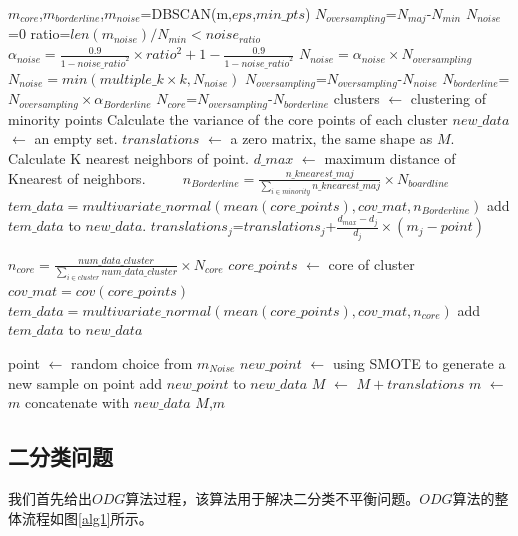 \documentclass{article}
\begin{document}
\begin{algorithm}[t]
  \begin{algorithmic}[1]
  \State $m_{core}$,$m_{borderline}$,$m_{noise}$=DBSCAN(m,$eps$,$min\_pts$) %
  \State $N_{oversampling}$=$N_{maj}$-$N_{min}$
      \State $N_{noise}$=0
  \Else
      \State ratio=$len(m_{noise})/N_{min}<noise_{ratio}$ 
      \State $\alpha_{noise}=\frac{0.9}{1-{noise\_{ratio}}^2}\times ratio^2+1-\frac{0.9}{1-{noise\_ratio}^2}$
      \State $N_{noise}=\alpha_{noise} \times N_{oversampling}$
      \State $N_{noise}=min(multiple\_k \times k, N_{noise})$
  \EndIf
  \State $N_{oversampling}$=$N_{oversampling}$-$N_{noise}$
  \State $N_{borderline}$=$N_{oversampling} \times \alpha_{Borderline}$
  \State $N_{core}$=$N_{oversampling}$-$N_{borderline}$
  \State clusters $\leftarrow$ clustering of minority points
  \State Calculate the variance of the core points of each cluster
  \State $new\_data$ $\leftarrow$ an empty set.
  \State $translations$ $\leftarrow$ a zero matrix, the same shape as $M$.
      \State Calculate K nearest neighbors of point.
      \State $d\_max$ $\leftarrow$ maximum distance of Knearest of neighbors.
  　　 \State $n_{Borderline}=\frac{n\_knearest\_maj}{\sum_{i\in minority} n\_knearest\_maj}\times N_{boardline}$
      \State $tem\_data=multivariate\_normal(mean(core\_points),cov\_mat,n_{Borderline})$
      \State add $tem\_data$ to $new\_data$.
        \State $translations_j$=$translations_j$+$\frac{d_{max}-d_{j}}{d_{j}}\times (m_{j}-point)$
      \EndFor
  \EndFor
  
    \State $n_{core}=\frac{num\_data\_cluster}{\sum_{i \in cluster} num\_data\_cluster} \times N_{core}$
    \State $core\_points$ $\leftarrow$ core of cluster
    \State $cov\_mat=cov(core\_points)$
    \State $tem\_data=multivariate\_normal(mean(core\_points),cov\_mat,n_{core})$
    \State add $tem\_data$ to $new\_data$
  \EndFor

    \State point $\leftarrow$ random choice from $m_{Noise}$
    \State $new\_point$ $\leftarrow$ using SMOTE to generate a new sample on point
    \State add $new\_point$ to $new\_data$
  \EndFor
  $M$ $\leftarrow$ $M+translations$
  $m$ $\leftarrow$ $m$ concatenate with $new\_data$
  \State \Return $M$,$m$
  \end{algorithmic}
  \end{algorithm}
\subsection{二分类问题}
我们首先给出$ODG$算法过程，该算法用于解决二分类不平衡问题。$ODG$算法的整体流程如图\ref{alg1}所示。
\end{document}
